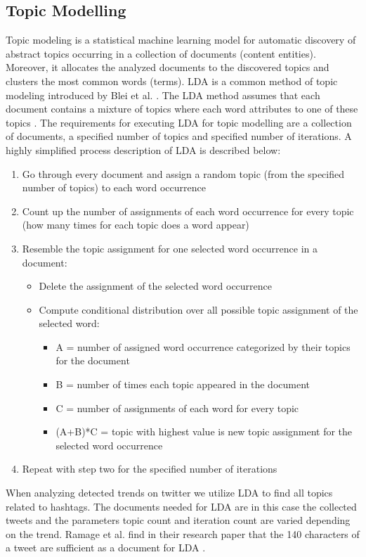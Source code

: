 \subsection{Topic Modelling}
\label{subsec:topic-modelling}
Topic modeling is a statistical machine learning model for automatic discovery of abstract topics occurring in a collection of documents (content entities). Moreover, it allocates the analyzed documents to the discovered topics and clusters the most common words (terms). \acf{LDA} is a common method of topic modeling introduced by Blei et al. \cite{Blei03lda}. The \ac{LDA} method assumes that each document contains a mixture of topics where each word attributes to one of these topics \cite{Blei03lda}. The requirements for executing \ac{LDA} for topic modelling are a collection of documents, a specified number of topics and specified number of iterations. A highly simplified process description of LDA is described below:
\begin{enumerate}
  \item{Go through every document and assign a random topic (from the specified number of topics) to each word occurrence}
  \item{Count up the number of assignments of each word occurrence for every topic (how many times for each topic does a word appear)}
  \item{Resemble the topic assignment for one selected word occurrence in a document:}
  \begin{itemize}
    \item{Delete the assignment of the selected word occurrence}
    \item{Compute conditional distribution over all possible topic assignment of the selected word:}
    \begin{itemize}
      \item{A = number of assigned word occurrence categorized by their topics for the document}
      \item{B = number of times each topic appeared in the document}
      \item{C = number of assignments of each word for every topic}
      \item{(A+B)*C = topic with highest value is new topic assignment for the selected word occurrence}
    \end{itemize}
  \end{itemize}
  \item{Repeat with step two for the specified number of iterations}
\end{enumerate}
When analyzing detected trends on twitter we utilize \ac{LDA} to find all topics related to hashtags. The documents needed for \ac{LDA} are in this case the collected tweets and the parameters topic count and iteration count are varied depending on the trend. Ramage et al. find in their research paper that the 140 characters of a tweet are sufficient as a document for \ac{LDA} \cite{ramage2010lda}.

